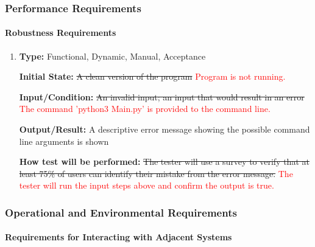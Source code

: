 \documentclass[12pt, titlepage]{article}
\begin{document}
\subsubsection{Performance Requirements}
\label{PerfReqs}
		
\paragraph{Robustness Requirements}

\begin{enumerate}[label=NFR-RR\arabic*:, wide=0pt, leftmargin=*]

\item \phantom{empty}

\textbf{Type:} Functional, Dynamic, Manual, Acceptance
					
\textbf{Initial State:} \sout{A clean version of the program} \textcolor{red}{Program is not running.}
					
\textbf{Input/Condition:} \sout{An invalid input; an input that would result in an error}
\textcolor{red}{The command 'python3 Main.py' is provided to the command line.}
					
\textbf{Output/Result:} A descriptive error message showing the possible command line arguments is shown
					
\textbf{How test will be performed:} \sout{The tester will use a survey to verify that at least 75\% of users can identify their mistake from the error message.}
\textcolor{red}{The tester will run the input steps above and confirm the output is true.}

\end{enumerate}

\subsubsection{Operational and Environmental Requirements}
		
\paragraph{Requirements for Interacting with Adjacent Systems}
\end{document}
